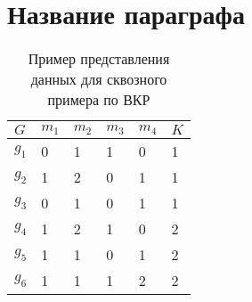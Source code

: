 	

	
\section{Название параграфа} \label{ch2:sec-very-short-title} %


	


%



\begin{table} [htbp]%
	\centering\small
	\caption{Пример представления данных для сквозного примера по ВКР \cite{Peskov2004}}%
	\label{tab:ToyCompare}		
		\begin{tabular}{|l|l|l|l|l|l|}
			\hline
			$G$&$m_1$&$m_2$&$m_3$&$m_4$&$K$\\
			\hline
			$g_1$&0&1&1&0&1\\ \hline
			$g_2$&1&2&0&1&1\\ \hline
			$g_3$&0&1&0&1&1\\ \hline
			$g_4$&1&2&1&0&2\\ \hline
			$g_5$&1&1&0&1&2\\ \hline
			$g_6$&1&1&1&2&2\\ \hline		
		\end{tabular}
	\normalsize%
\end{table}









